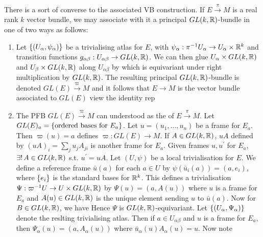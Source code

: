 \documentclass{article}
\begin{document}
There is a sort of converse to the associated VB construction. If $E \overset{\pi}{\to}M$ is a real rank $k$ vector bundle, we may associate with it a principal $GL(k,\mathbb{R})$-bundle in one of two ways as follows:
\begin{enumerate}
    \item Let $\left\{ (U_\alpha,\psi_\alpha) \right\}$ be a trivialising atlas for $E$, with $\psi_\alpha : \pi^{-1} U_\alpha \to U_\alpha \times \mathbb{R}^k$ and transition functions $g_{\alpha\beta}:U_{\alpha\beta} \to GL(k,\mathbb{R})$. We can then glue $U_\alpha \times GL(k,\mathbb{R})$ and 
    $U_\beta \times GL(k,\mathbb{R})$ along $U_{\alpha\beta}$ by 
    which is equivariant under right multiplication by $GL(k,\mathbb{R})$. The resulting principal $GL(k,\mathbb{R})$-bundle is denoted $GL(E) \overset{\varpi}{\to} M$ and it follows that $E \to M$ is the vector bundle associated to $GL(E)$ view the identity rep
    \item The PFB $GL(E) \overset{\varpi}{\to} M $ can understood as the  of $E \overset{\pi}{\to} M$. Let $GL(E)_a = \left\{ \text{ordered bases for }E_a \right\}$. Let $u = (u_1, \dots, u_n)$ be a frame for $E_a$. Then $\varpi(u) = a$ defines $\varpi : GL(E) \to M$. If $A \in GL(k,\mathbb{R})$, $uA$ defined by $(uA)_i = \sum_j u_j A_{ji}$ is another frame for $E_a$. Given frames $u,u^\prime$ for $E_a$, $\exists ! \, A \in GL(k,\mathbb{R})$ s.t. $u^\prime = uA$. Let $(U,\psi)$ be a local trivialisation for $E$. We define a reference frame $\bar{u}(a)$ for each $a \in U$ by $\psi(\bar{u}_i(a)) = (a,e_i)$, where $\left\{ e_i \right\}$ is the standard bases for $\mathbb{R}^k$. This defines a trivialisation $\Psi : \varpi^{-1} U \to U \times GL(k,\mathbb{R})$ by $\Psi(u) = (a,A(u))$ where $u$ is a frame for $E_a$ and $A(u)\in GL(k,\mathbb{R})$ is the unique element sending $u$ to $\bar{u}(a)$. Now for $B \in GL(k,\mathbb{R})$, we have 
    Hence $\Psi$ is $GL(k,\mathbb{R})$-equivariant. Let $\left\{ (U_\alpha,\Psi_\alpha) \right\}$ denote the reslting trivialising atlas. Then if $a \in U_{\alpha\beta}$ and $u$ is a frame for $E_a$, then $\Psi_\alpha(u) = (a,A_\alpha(u))$ where $\bar{u}_\alpha(u) A_\alpha(u) = u$. Now note 
\end{enumerate}
\end{document}
